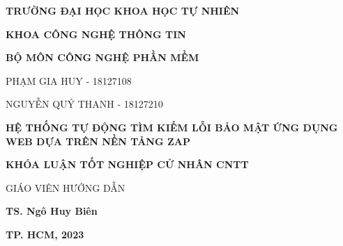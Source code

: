 \begin{titlepage}
    \centering

    \textbf{\textsf{\large TRƯỜNG ĐẠI HỌC KHOA HỌC TỰ NHIÊN }} 

    \vspace{10pt}

    \textbf{\textsf{\large KHOA CÔNG NGHỆ THÔNG TIN }}
    
    \vspace{10pt}

    \textbf{\textsf{\large BỘ MÔN CÔNG NGHỆ PHẦN MỀM }}
    
    \vspace{40pt}
    
    \large PHẠM GIA HUY - 18127108
    
    \vspace{10pt}

    \large NGUYỄN QUÝ THANH - 18127210
    
    \vspace{40pt}

    \textbf{\textsf{\LARGE HỆ THỐNG TỰ ĐỘNG TÌM KIẾM LỖI BẢO MẬT ỨNG DỤNG WEB DỰA TRÊN NỀN TẢNG ZAP }}
    
    \vspace{30pt}
    
    \textbf{\large KHÓA LUẬN TỐT NGHIỆP CỬ NHÂN CNTT }

    \vspace{30pt}

    \large GIÁO VIÊN HƯỚNG DẪN

    \vspace{20pt}

    \textbf{\textsf{\large TS. Ngô Huy Biên }}
    
    \vspace{10pt}
    
    \textbf{\large TP. HCM, 2023 }    
\end{titlepage}